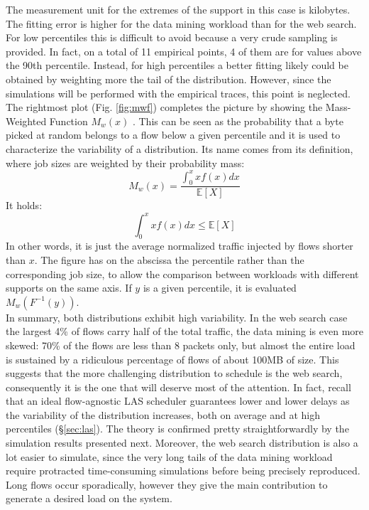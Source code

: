 The measurement unit for the extremes of the support in this case is kilobytes. The fitting error is higher for the data mining workload than for the web search. For low percentiles this is difficult to avoid because a very crude sampling is provided. In fact, on a total of 11 empirical points, 4 of them are for values above the 90th percentile. Instead, for high percentiles a better fitting likely could be obtained by weighting more the tail of the distribution. However, since the simulations will be performed with the empirical traces, this point is neglected. \\
The rightmost plot (Fig. \ref{fig:mwf}) completes the picture by showing the Mass-Weighted Function $M_w(x)$ \cite{mwf}. This can be seen as the probability that a byte picked at random belongs to a flow below a given percentile and it is used to characterize the variability of a distribution. Its name comes from its definition, where job sizes are weighted by their probability mass:
\[
M_w(x) = \dfrac{\int_{0}^{x} x f(x) dx}{\mathbb{E}[X]}
\]
It holds:
\[
\int\nolimits_{0}^{x} x f(x) dx \le \mathbb{E}[X]
\]
In other words, it is just the average normalized traffic injected by flows shorter than $x$. The figure has on the abscissa the percentile rather than the corresponding job size, to allow the comparison between workloads with different supports on the same axis. If $y$ is a given percentile, it is evaluated $M_w(F^{-1}(y))$. \\
In summary, both distributions exhibit high variability. In the web search case the largest 4\% of flows carry half of the total traffic, the data mining is even more skewed: 70\% of the flows are less than 8 packets only, but almost the entire load is sustained by a ridiculous percentage of flows of about 100MB of size. This suggests that the more challenging distribution to schedule is the web search, consequently it is the one that will deserve most of the attention. In fact, recall that an ideal flow-agnostic LAS scheduler guarantees lower and lower delays as the variability of the distribution increases, both on average and at high percentiles (\S \ref{sec:las}). The theory is confirmed pretty straightforwardly by the simulation results presented next. Moreover, the web search distribution is also a lot easier to simulate, since the very long tails of the data mining workload require protracted time-consuming simulations before being precisely reproduced. Long flows occur sporadically, however they give the main contribution to generate a desired load on the system. 

